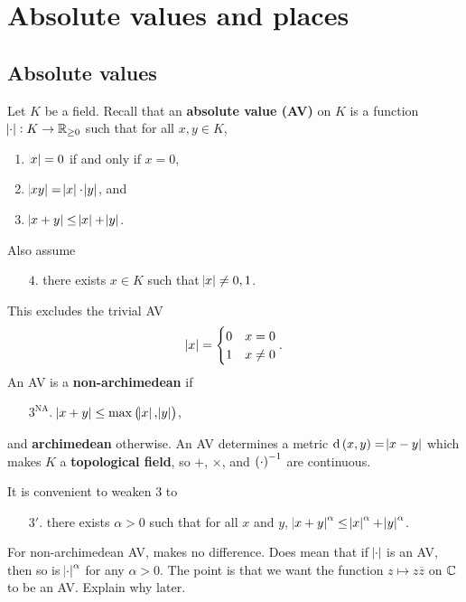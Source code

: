 \def\module{Algebraic Number Theory}
\def\lecturer{Professor Anthony Scholl}
\def\term{Lent 2020}
\def\cover{}
\def\syllabus{}
\def\thm{section}



\newcommand{\mods}{\mod\!\!^*\ }





\setcounter{section}{0}

\section{Absolute values and places}

\subsection{Absolute values}


Let $ K $ be a field. Recall that an \textbf{absolute value (AV)} on $ K $ is a function $ \abs{\cdot} : K \to \mathbb{R}_{\ge 0} $ such that for all $ x, y \in K $,
\begin{enumerate}
\item $ \abs{x} = 0 $ if and only if $ x = 0 $,
\item $ \abs{xy} = \abs{x} \cdot \abs{y} $, and
\item $ \abs{x + y} \le \abs{x} + \abs{y} $.
\end{enumerate}
Also assume
\begin{itemize}
\item[$ 4 $.] there exists $ x \in K $ such that $ \abs{x} \ne 0, 1 $.
\end{itemize}
This excludes the trivial AV
$$ \abs{x} =
\begin{cases}
0 & x = 0 \\
1 & x \ne 0
\end{cases}.
$$
An AV is a \textbf{non-archimedean} if
\begin{itemize}
\item[$ 3^{\text{NA}} $.] $ \abs{x + y} \le \max\br{\abs{x}, \abs{y}} $,
\end{itemize}
and \textbf{archimedean} otherwise. An AV determines a metric $ \d\br{x, y} = \abs{x - y} $ which makes $ K $ a \textbf{topological field}, so $ + $, $ \times $, and $ \br{\cdot}^{-1} $ are continuous.

\begin{remark*}
It is convenient to weaken $ 3 $ to
\begin{itemize}
\item[$ 3' $.] there exists $ \alpha > 0 $ such that for all $ x $ and $ y $, $ \abs{x + y}^\alpha \le \abs{x}^\alpha + \abs{y}^\alpha $.
\end{itemize}
For non-archimedean AV, makes no difference. Does mean that if $ \abs{\cdot} $ is an AV, then so is $ \abs{\cdot}^\alpha $ for any $ \alpha > 0 $. The point is that we want the function $ z \mapsto z\overline{z} $ on $ \mathbb{C} $ to be an AV. Explain why later.
\end{remark*}

